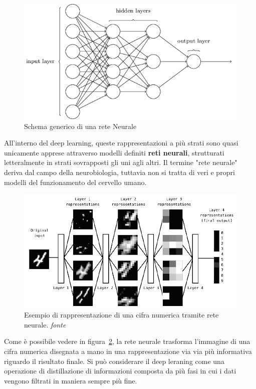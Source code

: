 \begin{figure}[!bp]
	\centering
	\includegraphics[width=\columnwidth]{figures/mlp-network.png}
	\caption{Schema generico di una rete Neurale \label{nn}}
\end{figure} 
 
All'interno del deep learning, queste rappresentazioni a più strati sono quasi unicamente apprese attraverso modelli definiti \textbf{reti neurali}, strutturati letteralmente in strati sovrapposti gli uni agli altri. Il termine "rete neurale" deriva dal campo della neurobiologia, tuttavia non si tratta di veri e propri modelli del funzionamento del cervello umano.

\begin{figure}[!bp]
	\centering
	\includegraphics[width=\columnwidth]{figures/deeplearning.png}
	\caption{Esempio di rappresentazione di una cifra numerica tramite rete neurale. \textit{fonte}%
	~\cite{chollet2017deep} \label{fig:neuralnetwork} }
\end{figure}

Come è possibile vedere in figura~\ref{fig:neuralnetwork}, la rete neurale trasforma l'immagine di una cifra numerica disegnata a mano in una rappresentazione via via più informativa riguardo il risultato finale. Si può considerare il deep leraning come una operazione di distillazione di informazioni composta da più fasi in cui i dati vengono filtrati in maniera sempre più fine.

